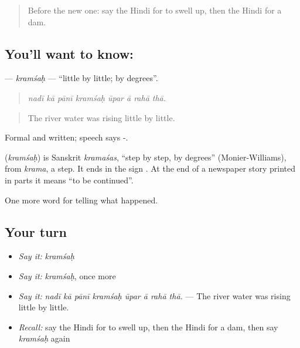 \label{lesson:HI-C305-kramsah}



\begin{quote}
Before the new one: say the Hindi for to swell up, then the Hindi for a dam.
\end{quote}

\subsection*{You'll want to know: }
\textbf{} — \emph{kramśaḥ} — \textquotedblleft{}little by little; by degrees\textquotedblright{}.

\begin{quote}
       
\end{quote}

\begin{quote}
\emph{nadī kā pānī kramśaḥ ūpar ā rahā thā.}
\end{quote}

\begin{quote}
The river water was rising little by little.
\end{quote}

Formal and written; speech says -.

\begin{cousinweb}
\textbf{} (\emph{kramśaḥ}) is Sanskrit \emph{kramaśas}, \textquotedblleft{}step by step, by degrees\textquotedblright{} (Monier-Williams), from \emph{krama}, a step. It ends in the sign \textbf{}. At the end of a newspaper story printed in parts it means \textquotedblleft{}to be continued\textquotedblright{}.
\end{cousinweb}

\begin{grammarlens}[title={What you've built}]
One more word for telling what happened.
\end{grammarlens}

\subsection*{Your turn}
\begin{itemize}
\raggedright
  \item \emph{Say it:} \emph{kramśaḥ}
  \item \emph{Say it:} \emph{kramśaḥ}, once more
  \item \emph{Say it:} \emph{nadī kā pānī kramśaḥ ūpar ā rahā thā.} — The river water was rising little by little.
  \item \emph{Recall:} say the Hindi for to swell up, then the Hindi for a dam, then say \emph{kramśaḥ} again
\end{itemize}

